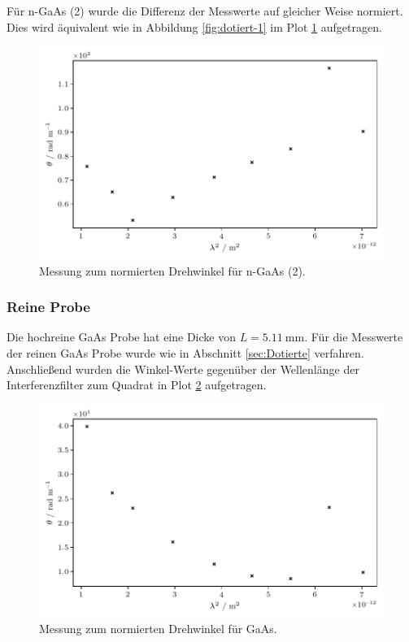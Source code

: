 Für n-GaAs (2) wurde die Differenz der Messwerte auf gleicher Weise normiert.
Dies wird äquivalent wie in Abbildung \ref{fig:dotiert-1} im Plot \ref{fig:dotiert-2} aufgetragen.

\begin{figure}[H]
    \centering
    \includegraphics{build/doped-2.pdf}
    \caption{Messung zum normierten Drehwinkel für n-GaAs (2).}
    \label{fig:dotiert-2}
\end{figure}

\subsubsection{Reine Probe}

Die hochreine GaAs Probe hat eine Dicke von $L = \qty{5.11}{\milli\meter}$.
Für die Messwerte der reinen GaAs Probe wurde wie in Abschnitt \ref{sec:Dotierte} verfahren.
Anschließend wurden die Winkel-Werte gegenüber der Wellenlänge der Interferenzfilter zum Quadrat in Plot \ref{fig:rein}
aufgetragen.

\begin{figure}[H] 
    \centering
    \includegraphics{build/pure.pdf}
    \caption{Messung zum normierten Drehwinkel für GaAs.}
    \label{fig:rein}
\end{figure}

